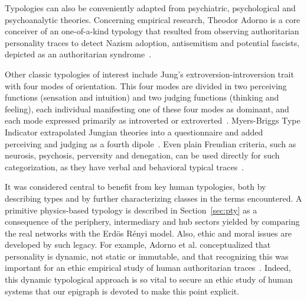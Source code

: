 \documentclass[%
 aip,
 jmp,%
 amsmath,amssymb,
 reprint,%
]{revtex4-1}
\begin{document}
Typologies can also be conveniently adapted from psychiatric, psychological and psychoanalytic theories.
Concerning empirical research,
Theodor Adorno is a core conceiver of an one-of-a-kind typology that resulted from observing authoritarian
personality traces to detect Nazism adoption, antisemitism and potential fascists, depicted as an authoritarian syndrome~\cite{adorno}.



Other classic typologies of interest include Jung's extroversion-introversion trait with four modes of orientation. This four modes are divided in two perceiving functions (sensation and intuition) and two judging functions (thinking and feeling), each individual manifesting one of these four modes as dominant, and each mode expressed primarily as introverted or extroverted~\cite{jung}. Myers-Briggs Type Indicator extrapolated Jungian theories into a questionnaire and added perceiving and judging as a fourth dipole~\cite{myers}. Even plain Freudian criteria, such as neurosis, psychosis, perversity and denegation, can be used directly for such categorization, as they have verbal and behavioral typical traces~\cite{freud,freud2}.

It was considered central to benefit from key human typologies, both by describing types and by further characterizing classes in the terms encountered. A primitive physics-based typology is described in Section~\ref{sec:pty} as a consequence of the periphery, intermediary and hub sectors yielded by comparing the real networks with the Erd\"os R\'enyi model.
Also, ethic and moral issues are developed by such legacy. For example, Adorno et al. conceptualized that personality is dynamic, not static or immutable, and that recognizing this was important for an ethic empirical study of human authoritarian traces~\cite{adorno}.
Indeed, this dynamic typological approach is so vital to secure an ethic study of human systems that our epigraph is devoted to make this point explicit.
\end{document}
